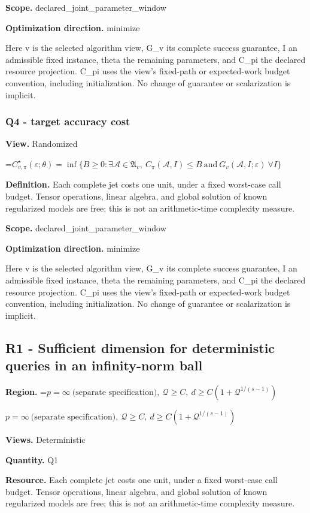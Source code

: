 \documentclass[10pt,a4paper]{article}
\newcommand{\AtlasMath}[1]{\par\begingroup\centering\setbox0=\hbox{$\displaystyle #1$}\ifdim\wd0>1.4\linewidth\typeout{ATLAS WIDE FORMULA: \the\wd0}\fi\ifdim\wd0>\linewidth\resizebox{\linewidth}{!}{\box0}\else\box0\fi\par\endgroup}
\newcommand{\AtlasInlineMath}[1]{\begingroup\setbox0=\hbox{$#1$}\ifdim\wd0>.4\linewidth\endgroup\AtlasMath{#1}\else\endgroup$#1$\fi}
\begin{document}
\textbf{Scope.} declared\_joint\_parameter\_window

\textbf{Optimization direction.} minimize

Here v is the selected algorithm view, G\_v its complete success guarantee, I an admissible fixed instance, theta the remaining parameters, and C\_pi the declared resource projection. C\_pi uses the view's fixed-path or expected-work budget convention, including initialization. No change of guarantee or scalarization is implicit.

\subsubsection{Q4 - target accuracy cost}
\textbf{View.} Randomized

\AtlasMath{C^\star_{v,\pi}(\varepsilon;\theta)=\inf\{B\ge0:\exists\mathcal A\in\mathfrak A_v,\ C_\pi(\mathcal A,I)\le B\ \text{and}\ G_v(\mathcal A,I;\varepsilon)\ \forall I\}}
\textbf{Definition.} Each complete jet costs one unit, under a fixed worst-case call budget. Tensor operations, linear algebra, and global solution of known regularized models are free; this is not an arithmetic-time complexity measure.

\textbf{Scope.} declared\_joint\_parameter\_window

\textbf{Optimization direction.} minimize

Here v is the selected algorithm view, G\_v its complete success guarantee, I an admissible fixed instance, theta the remaining parameters, and C\_pi the declared resource projection. C\_pi uses the view's fixed-path or expected-work budget convention, including initialization. No change of guarantee or scalarization is implicit.

\subsection{R1 - Sufficient dimension for deterministic queries in an infinity-norm ball}
\textbf{Region.} \AtlasInlineMath{p=\infty\ \text{(separate specification)},\ \mathcal{Q}\ge C,\ d\ge C(1+\mathcal{Q}^{1/(s-1)})}

\textbf{Views.} Deterministic

\textbf{Quantity.} Q1

\textbf{Resource.} Each complete jet costs one unit, under a fixed worst-case call budget. Tensor operations, linear algebra, and global solution of known regularized models are free; this is not an arithmetic-time complexity measure.
\end{document}
